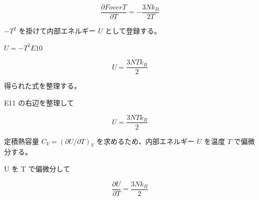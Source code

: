 \documentclass[dvipdfmx,a4paper,11pt]{jsarticle}
\begin{document}
\begin{equation}
  \frac{\partial FoverT}{\partial T} = -\frac{3 N k_{B}}{2 T}
  \label{eq:E10}
\end{equation}

$-T^2$ を掛けて内部エネルギー $U$ として登録する。

$U = -T^2 E10$

\begin{equation}
  U = \frac{3 N T k_{B}}{2}
  \label{eq:E11}
\end{equation}

得られた式を整理する。

E11 の右辺を整理して

\begin{equation}
  U = \frac{3 N T k_{B}}{2}
  \label{eq:E12}
\end{equation}

定積熱容量 $C_V=(\partial U/\partial T)_V$ を求めるため、内部エネルギー $U$ を温度 $T$ で偏微分する。

U を T で偏微分して

\begin{equation}
  \frac{\partial U}{\partial T} = \frac{3 N k_{B}}{2}
  \label{eq:E13}
\end{equation}
\end{document}
